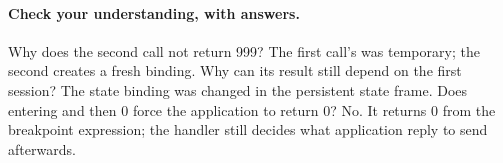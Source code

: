 \paragraph{Check your understanding, with answers.}
Why does the second call not return 999?
The first call's  was temporary; the second creates a fresh binding.
Why can its result still depend on the first session?
The state binding  was changed in the persistent state frame.
Does entering  and then 0 force the application to return 0?
No. It returns 0 from the breakpoint expression; the handler still decides
what application reply to send afterwards.
